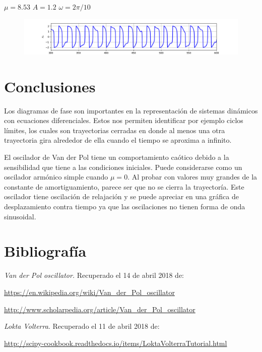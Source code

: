 \documentclass[a4paper]{article}
\begin{document}
\begin{center}
$\mu=8.53$
$A=1.2$
$ \omega=2\pi/10$
\end{center}




\begin{figure}[ht!]
\centering
\includegraphics[width=1\textwidth]{Figura4.png}
\end{figure}



\section{Conclusiones}
Los diagramas de fase son importantes en la representación de sistemas dinámicos con ecuaciones diferenciales. Estos nos permiten identificar por ejemplo ciclos límites, los cuales son trayectorias cerradas en donde al menos una otra trayectoria gira alrededor de ella cuando el tiempo se aproxima a infinito.

El oscilador de Van der Pol tiene un comportamiento caótico debido a la sensibilidad que tiene a las condiciones iniciales. Puede considerarse como un oscilador armónico simple cuando $\mu=0$. Al probar con valores muy grandes de la constante de amortiguamiento, parece ser que no se cierra la trayectoría. 
Este oscilador tiene oscilación de relajación y se puede apreciar en una gráfica de desplazamiento contra tiempo ya que las oscilaciones no tienen forma de onda sinusoidal.


\section{Bibliografía}

\textit{Van der Pol oscillator. } Recuperado el 14 de abril 2018 de:

\url{https://en.wikipedia.org/wiki/Van_der_Pol_oscillator}

\url{http://www.scholarpedia.org/article/Van_der_Pol_oscillator}



\textit{Lokta Volterra}. Recuperado el 11 de abril 2018 de:

\url{http://scipy-cookbook.readthedocs.io/items/LoktaVolterraTutorial.html}
\end{document}
